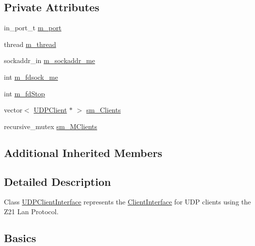 \subsection*{Private Attributes}
\begin{DoxyCompactItemize}
\item 
in\+\_\+port\+\_\+t \hyperlink{classTBT_1_1UDPClientInterface_ad867ee98c92aceffd8a7e48d82fb56d8_ad867ee98c92aceffd8a7e48d82fb56d8}{m\+\_\+port}
\item 
thread \hyperlink{classTBT_1_1UDPClientInterface_a9de3a81eedc6b4fff185ba58aa554821_a9de3a81eedc6b4fff185ba58aa554821}{m\+\_\+thread}
\item 
sockaddr\+\_\+in \hyperlink{classTBT_1_1UDPClientInterface_a5adeebce6d0adc96e590d45ffcd2103a_a5adeebce6d0adc96e590d45ffcd2103a}{m\+\_\+sockaddr\+\_\+me}
\item 
int \hyperlink{classTBT_1_1UDPClientInterface_a12f8f9eb8a8b44876f24ca146b24c99d_a12f8f9eb8a8b44876f24ca146b24c99d}{m\+\_\+fdsock\+\_\+me}
\item 
int \hyperlink{classTBT_1_1UDPClientInterface_a487ce29e92a6df41d8d5346f523b27ff_a487ce29e92a6df41d8d5346f523b27ff}{m\+\_\+fd\+Stop}
\item 
vector$<$ \hyperlink{classTBT_1_1UDPClient}{U\+D\+P\+Client} $\ast$ $>$ \hyperlink{classTBT_1_1UDPClientInterface_aeda0ecc87606d12d0de088344b2b31cc_aeda0ecc87606d12d0de088344b2b31cc}{sm\+\_\+\+Clients}
\item 
recursive\+\_\+mutex \hyperlink{classTBT_1_1UDPClientInterface_a8aa85fe79ea5527845988eed7d8758ab_a8aa85fe79ea5527845988eed7d8758ab}{sm\+\_\+\+M\+Clients}
\end{DoxyCompactItemize}
\subsection*{Additional Inherited Members}


\subsection{Detailed Description}
Class \hyperlink{classTBT_1_1UDPClientInterface}{U\+D\+P\+Client\+Interface} represents the \hyperlink{classTBT_1_1ClientInterface}{Client\+Interface} for U\+DP clients using the Z21 Lan Protocol.

\subsection*{Basics}

